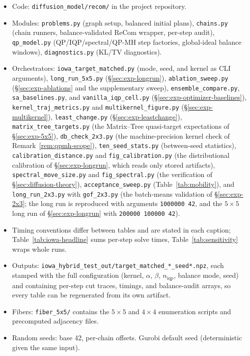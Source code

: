 \documentclass[11pt]{article}
\begin{document}
\begin{itemize}
  \item Code: \texttt{diffusion\_model/recom/} in the project
    repository.
  \item Modules: \texttt{problems.py} (graph setup, balanced initial
    plans), \texttt{chains.py} (chain runners, balance-validated
    ReCom wrapper, per-step audit), \texttt{qp\_model.py}
    (QP/IQP/spectral/QP-MH step factories, global-ideal balance
    windows), \texttt{diagnostics.py} (KL/TV diagnostics).
  \item Orchestrators: \texttt{iowa\_target\_matched.py} (mode, seed,
    and kernel as CLI arguments), \texttt{long\_run\_5x5.py}
    (\S\ref{sec:exp-longrun}), \texttt{ablation\_sweep.py}
    (\S\ref{sec:exp-ablations} and the supplementary sweep),
    \texttt{ensemble\_compare.py}, \texttt{sa\_baselines.py}, and
    \texttt{vanilla\_iqp\_cell.py}
    (\S\ref{sec:exp-optimizer-baselines}),
    \texttt{kernel\_traj\_metrics.py} and
    \texttt{multikernel\_figure.py} (\S\ref{sec:exp-multikernel}),
    \texttt{least\_change.py} (\S\ref{sec:exp-leastchange}),
    \texttt{matrix\_tree\_targets.py} (the Matrix--Tree
    quasi-target expectations of \S\ref{sec:exp-5x5}),
    \texttt{db\_check\_2x3.py} (the machine-precision kernel check of
    Remark~\ref{rem:qpmh-scope}),
    \texttt{ten\_seed\_stats.py} (between-seed statistics),
    \texttt{calibration\_distance.py} and \texttt{fig\_calibration.py}
    (the distributional calibration of \S\ref{sec:exp-longrun}, which
    reads only stored artifacts),
    \texttt{spectral\_move\_size.py} and \texttt{fig\_spectral.py}
    (the verification of \S\ref{sec:diffusion-theory}),
    \texttt{acceptance\_sweep.py} (Table~\ref{tab:mobility}), and
    \texttt{long\_run\_2x3.py} with \texttt{gof\_2x3.py} (the
    batch-means validation of \S\ref{sec:exp-2x3}; the long run is
    reproduced with arguments \texttt{1000000 42}, and the
    $5 \times 5$ long run of \S\ref{sec:exp-longrun} with
    \texttt{200000 100000 42}).
  \item Timing conventions differ between tables and are stated in
    each caption; Table~\ref{tab:iowa-headline} sums per-step solve
    times, Table~\ref{tab:sensitivity} wraps whole runs.
  \item Outputs:
    \texttt{iowa\_hybrid\_test\_out/target\_matched\_*\_seed*.npz},
    each stamped with the full configuration (kernel, $\alpha$,
    $\beta$, $n_{\mathrm{iqp}}$, balance mode, seed) and containing
    per-step cut traces, timings, and balance-audit arrays, so every
    table can be regenerated from its own artifact.
  \item Fibers: \texttt{fiber\_5x5/} contains the $5 \times 5$ and
    $4 \times 4$ enumeration scripts and precomputed
    adjacency files.
  \item Random seeds: base 42, per-chain offsets. Gurobi default seed
    (deterministic given the same input).
\end{itemize}



\end{document}
